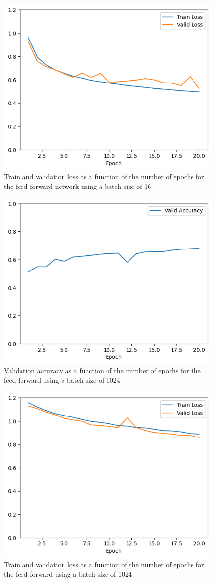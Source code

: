 \documentclass[12pt]{article}
\begin{document}
\begin{itemize}
          \begin{figure}[H]
              \centering
              \includegraphics[width=0.5\linewidth]{../outputs/hw1-q2-2a-loss-16.png}
              \caption{Train and validation loss as a function of the number of epochs for the feed-forward network using a batch size of 16}
              \label{fig:2.2a:loss:16}
          \end{figure}

          \begin{figure}[H]
              \centering
              \includegraphics[width=0.5\linewidth]{../outputs/hw1-q2-2a-acc-1024.png}
              \caption{Validation accuracy as a function of the number of epochs for the feed-forward using a batch size of 1024}
              \label{fig:2.2a:acc:1024}
          \end{figure}

          \begin{figure}[H]
              \centering
              \includegraphics[width=0.5\linewidth]{../outputs/hw1-q2-2a-loss-1024.png}
              \caption{Train and validation loss as a function of the number of epochs for the feed-forward using a batch size of 1024}
              \label{fig:2.2a:loss:1024}
          \end{figure}
\end{itemize}
\end{document}
